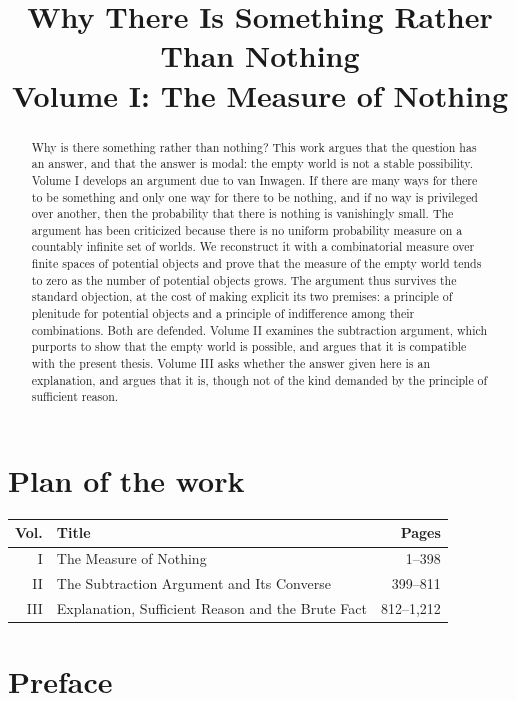 \documentclass{situationist-preprint}
\title{Why There Is Something Rather Than Nothing\\[0.4em]\large Volume I: The Measure of Nothing}
\begin{document}
\maketitle

\begin{abstract}
Why is there something rather than nothing? This work argues that the question has an answer, and that the answer is modal: the empty world is not a stable possibility. Volume I develops an argument due to van Inwagen. If there are many ways for there to be something and only one way for there to be nothing, and if no way is privileged over another, then the probability that there is nothing is vanishingly small. The argument has been criticized because there is no uniform probability measure on a countably infinite set of worlds. We reconstruct it with a combinatorial measure over finite spaces of potential objects and prove that the measure of the empty world tends to zero as the number of potential objects grows. The argument thus survives the standard objection, at the cost of making explicit its two premises: a principle of plenitude for potential objects and a principle of indifference among their combinations. Both are defended. Volume II examines the subtraction argument, which purports to show that the empty world is possible, and argues that it is compatible with the present thesis. Volume III asks whether the answer given here is an explanation, and argues that it is, though not of the kind demanded by the principle of sufficient reason.
\end{abstract}

\section*{Plan of the work}

\begin{center}\small
\begin{tabular}{@{}rlr@{}}
\toprule
Vol. & Title & Pages \\
\midrule
I & The Measure of Nothing & 1--398 \\
II & The Subtraction Argument and Its Converse & 399--811 \\
III & Explanation, Sufficient Reason and the Brute Fact & 812--1,212 \\
\bottomrule
\end{tabular}
\end{center}

\section*{Preface}
\end{document}
